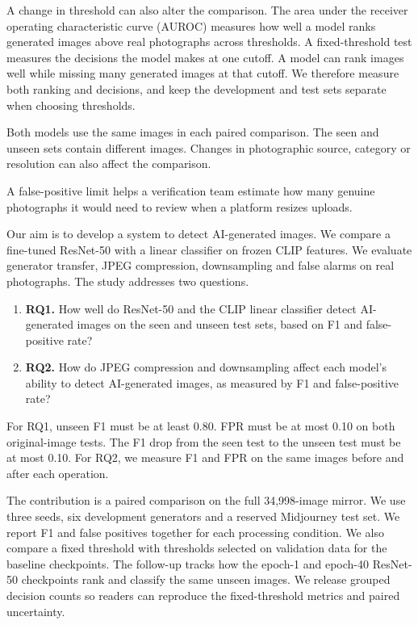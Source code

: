 \documentclass[11pt,a4paper]{article}
\begin{document}
A change in threshold can also alter the comparison. The area under the receiver operating characteristic curve (AUROC) measures how well a model ranks generated images above real photographs across thresholds. A fixed-threshold test measures the decisions the model makes at one cutoff. A model can rank images well while missing many generated images at that cutoff. We therefore measure both ranking and decisions, and keep the development and test sets separate when choosing thresholds.

Both models use the same images in each paired comparison. The seen and unseen sets contain different images. Changes in photographic source, category or resolution can also affect the comparison.

A false-positive limit helps a verification team estimate how many genuine photographs it would need to review when a platform resizes uploads.

Our aim is to develop a system to detect AI-generated images. We compare a fine-tuned ResNet-50 with a linear classifier on frozen CLIP features. We evaluate generator transfer, JPEG compression, downsampling and false alarms on real photographs. The study addresses two questions.

\begin{enumerate}[leftmargin=*,itemsep=3pt,topsep=4pt]
\item \textbf{RQ1.} How well do ResNet-50 and the CLIP linear classifier detect AI-generated images on the seen and unseen test sets, based on F1 and false-positive rate?
\item \textbf{RQ2.} How do JPEG compression and downsampling affect each model's ability to detect AI-generated images, as measured by F1 and false-positive rate?
\end{enumerate}

For RQ1, unseen F1 must be at least 0.80. FPR must be at most 0.10 on both original-image tests. The F1 drop from the seen test to the unseen test must be at most 0.10. For RQ2, we measure F1 and FPR on the same images before and after each operation.

The contribution is a paired comparison on the full 34,998-image mirror. We use three seeds, six development generators and a reserved Midjourney test set. We report F1 and false positives together for each processing condition. We also compare a fixed threshold with thresholds selected on validation data for the baseline checkpoints. The follow-up tracks how the epoch-1 and epoch-40 ResNet-50 checkpoints rank and classify the same unseen images. We release grouped decision counts so readers can reproduce the fixed-threshold metrics and paired uncertainty.
\end{document}
